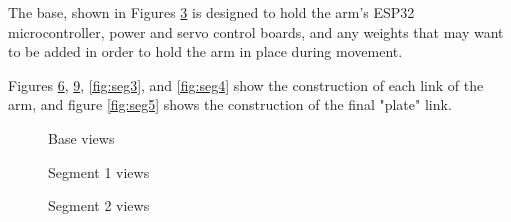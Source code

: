 \documentclass[a4paper,11pt]{article}
\begin{document}
The base, shown in Figures \ref{fig:base} is designed to hold the arm's ESP32 microcontroller, power and servo control boards, and any weights that may want to be added in order to hold the arm in place during movement.

Figures \ref{fig:seg1}, \ref{fig:seg2}, \ref{fig:seg3}, and \ref{fig:seg4} show the construction of each link of the arm, and figure \ref{fig:seg5} shows the construction of the final "plate" link.

\begin{figure}[H]
    \centering
    \begin{subfigure}{0.48\linewidth}
        \centering
         
        \label{fig:base_a}
    \end{subfigure}
    \hfill
    \begin{subfigure}{0.48\linewidth}
        \centering
         
        \label{fig:base_b}
    \end{subfigure}
    \caption{Base views}
    \label{fig:base}
\end{figure}

\begin{figure}[H]
    \centering
    \begin{subfigure}{0.48\linewidth}
        \centering
         
        \label{fig:seg1_a}
    \end{subfigure}
    \hfill
    \begin{subfigure}{0.48\linewidth}
        \centering
         
        \label{fig:seg1_b}
    \end{subfigure}
    \caption{Segment 1 views}
    \label{fig:seg1}
\end{figure}

\begin{figure}[H]
    \centering
    \begin{subfigure}{0.48\linewidth}
        \centering
         
        \label{fig:seg2_a}
    \end{subfigure}
    \hfill
    \begin{subfigure}{0.48\linewidth}
        \centering
         
        \label{fig:seg2_b}
    \end{subfigure}
    \caption{Segment 2 views}
    \label{fig:seg2}
\end{figure}
\end{document}
